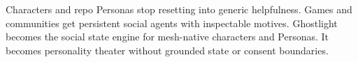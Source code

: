 \ProjectionBand
{Characters and repo Personas stop resetting into generic helpfulness.}
{Games and communities get persistent social agents with inspectable motives.}
{Ghostlight becomes the social state engine for mesh-native characters and Personas.}
{It becomes personality theater without grounded state or consent boundaries.}


